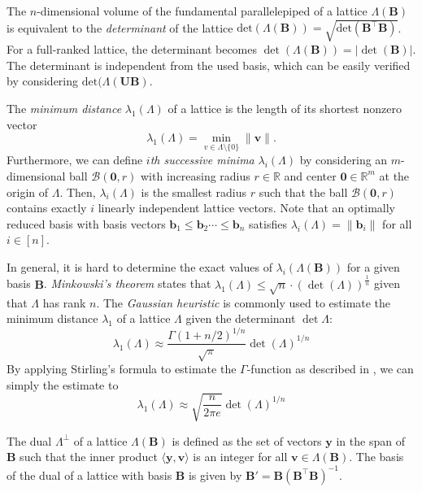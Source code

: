 The $n$-dimensional volume of the fundamental parallelepiped of a lattice $\Lambda(\mathbf{B})$ is equivalent to the \textit{determinant} of the lattice $\text{det}(\Lambda(\mathbf{B})) = \sqrt{\text{det}\left(\mathbf{B}^\intercal \mathbf{B}\right)}$. For a full-ranked lattice, the determinant becomes $\det(\Lambda(\mathbf{B})) = |\det(\mathbf{B})|$. The determinant is independent from the used basis, which can be easily verified by considering  $\text{det}(\Lambda(\mathbf{U}\mathbf{B})$.

The \textit{minimum distance} $\lambda_1(\Lambda)$ of a lattice is the length of its shortest nonzero vector
\begin{equation}
    \lambda_1(\Lambda) = \min_{v \in \Lambda \setminus \{0\}}\|\mathbf{v}\|.
\end{equation}
Furthermore, we can define \textit{$i$th successive minima} $\lambda_i(\Lambda)$ by considering an $m$-dimensional ball $\mathcal{B}(\mathbf{0}, r)$ with increasing radius $r \in \mathbb{R}$ and center $\mathbf{0} \in \mathbb{R}^m$ at the origin of $\Lambda$. Then,  $\lambda_i(\Lambda)$ is the smallest radius $r$ such that the ball $\mathcal{B}(\mathbf{0}, r)$ contains exactly $i$ linearly independent lattice vectors. Note that an optimally reduced basis with basis vectors $\mathbf{b}_1 \leq \mathbf{b}_2 \cdots \leq \mathbf{b}_n$ satisfies $\lambda_i(\Lambda) = \|\mathbf{b}_i\|$ for all $i\in [n]$.


In general, it is hard to determine the exact values of $\lambda_i(\Lambda(\mathbf{B}))$ for a given basis $\mathbf{B}$. \textit{Minkowski's theorem} states that $\lambda_1(\Lambda) \leq \sqrt{n} \cdot (\det(\Lambda))^{\frac{1}{n}}$ given that $\Lambda$ has rank $n$.
The \textit{Gaussian heuristic} is commonly used to estimate the minimum distance $\lambda_1$ of a lattice $\Lambda$ given the determinant $\det{\Lambda}$:
\begin{equation}\label{eq:gaussian-heuristic}
    \lambda_1(\Lambda) \approx \frac{\Gamma(1 + n/2)^{1/n}}{\sqrt{\pi}} \det(\Lambda)^{1/n}
\end{equation}
By applying Stirling's formula to estimate the $\Gamma$-function as described in \cite{Gop16}, we can simply the estimate to
\begin{equation}\label{eq:simplified-gaussian-heuristic}
    \lambda_1(\Lambda) \approx \sqrt{\frac{n}{2\pi e}} \det(\Lambda)^{1/n}
\end{equation}

The dual $\Lambda^{\perp}$ of a lattice $\Lambda(\mathbf{B})$ is defined as the set of vectors $\mathbf{y}$ in the span of $\mathbf{B}$ such that the inner product $\langle \mathbf{y}, \mathbf{v} \rangle$  is an integer for all $\mathbf{v} \in \Lambda(\mathbf{B})$. The basis of the dual of a lattice with basis $\mathbf{B}$ is given by $\mathbf{B'} = \mathbf{B} (\mathbf{B}^\intercal \mathbf{B})^{-1}$.

